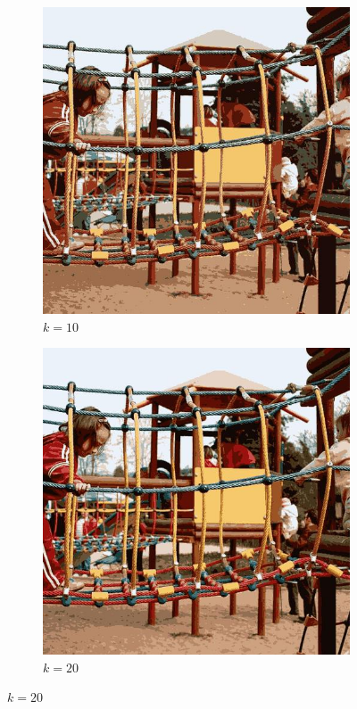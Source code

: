 \documentclass{article}
\begin{document}
\begin{figure}[H]
\begin{adjustwidth}{2cm}{}
    \vspace{1em}

    \begin{subfigure}[b]{0.40\textwidth}
        \includegraphics[width=\textwidth]{image_clustered_10.jpg}
        \caption{\(k=10\)}
    \end{subfigure}
    \hfill
    \begin{subfigure}[b]{0.40\textwidth}
        \includegraphics[width=\textwidth]{image_clustered_20.jpg}
        \caption{\(k=20\)}
    \end{subfigure}
    

\end{adjustwidth}
\end{figure}
\end{document}
